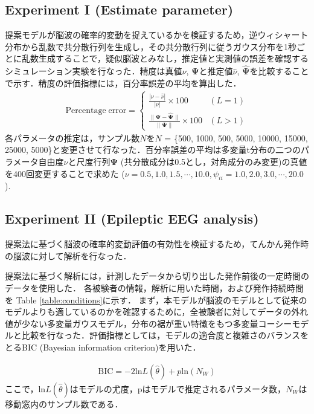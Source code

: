 \documentclass[journal]{IEEEtran}
\begin{document}
\subsection{Experiment I (Estimate parameter) }
提案モデルが脳波の確率的変動を捉えているかを検証するため，逆ウィシャート分布から乱数で共分散行列を生成し，その共分散行列に従うガウス分布を1秒ごとに乱数生成することで，疑似脳波とみなし，推定値と実測値の誤差を確認するシミュレーション実験を行なった．精度は真値$\nu$, $\mathbf{\Psi}$と推定値$\hat{\nu}$, $\hat{\mathbf{\Psi}}$を比較することで示す．精度の評価指標には，百分率誤差の平均を算出した．
\begin{eqnarray}%
	\mathrm{Percentage\;error} = \begin{cases}
    \displaystyle  \frac{|\nu-\hat{\nu}|}{|\nu|}\times100 & (L=1)\\
    \displaystyle \frac{\|\mathbf{\Psi}-\hat{\mathbf{\Psi}}\|}{\|\mathbf{\Psi}\|}\times100 & (L>1)
\end{cases}
\end{eqnarray}
各パラメータの推定は，サンプル数$N$を$N$ = \{500, 1000, 500, 5000, 10000, 15000, 25000, 5000\}と変更させて行なった．百分率誤差の平均は多変量t分布の二つのパラメータ自由度$\nu$と尺度行列$\mathbf{\Psi}$ (共分散成分は0.5とし，対角成分のみ変更)の真値を400回変更することで求めた ($\nu=0.5,1.0,1.5,\cdots,10.0, \psi_{ii} =1.0, 2.0, 3.0,\cdots, 20.0$).

\subsection{Experiment II (Epileptic EEG analysis)}
提案法に基づく脳波の確率的変動評価の有効性を検証するため，てんかん発作時の脳波に対して解析を行なった．

提案法に基づく解析には，計測したデータから切り出した発作前後の一定時間のデータを使用した．
各被験者の情報，解析に用いた時間，および発作持続時間を Table \ref{table:conditions}に示す．
まず，本モデルが脳波のモデルとして従来のモデルよりも適しているのかを確認するために，全被験者に対してデータの外れ値が少ない多変量ガウスモデル，分布の裾が重い特徴をもつ多変量コーシーモデルと比較を行なった．評価指標としては，モデルの適合度と複雑さのバランスをとるBIC (Bayesian information criterion)を用いた．

\begin{eqnarray}%
	\mathrm{BIC} = -2 \mathrm{ln}L(\hat{\theta}) + p \mathrm{ln}(N_W)
\end{eqnarray}
ここで，$\mathrm{ln}L(\hat{\theta})$はモデルの尤度，pはモデルで推定されるパラメータ数，$N_W$は移動窓内のサンプル数である．
\end{document}
